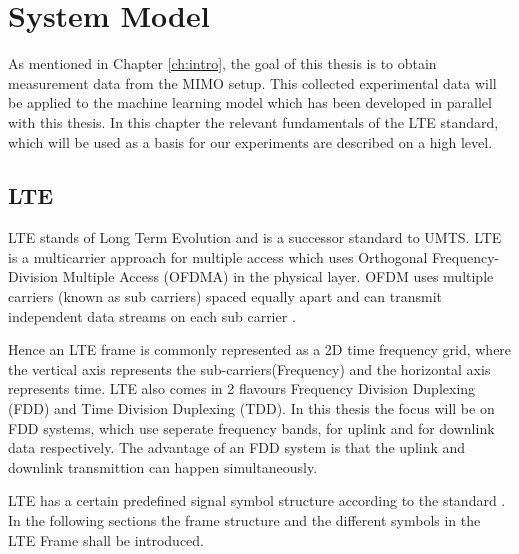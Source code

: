 \chapter{System Model}
\label{ch:sysmodel}

As mentioned in Chapter \ref{ch:intro}, the goal of this thesis is to obtain measurement data from the MIMO setup. This collected experimental data will be applied to the machine learning model which has been developed in parallel with this thesis. In this chapter the relevant fundamentals of the LTE standard, which will be used as a basis for our experiments are described on a high level.

%

\section{LTE}\label{sec:LTEProc}

LTE stands of Long Term Evolution and is a successor standard to UMTS. LTE is a multicarrier approach for multiple access which uses Orthogonal Frequency-Division Multiple Access (OFDMA) in the physical layer. OFDM uses multiple carriers (known as sub carriers) spaced equally apart and can transmit independent data streams on each sub carrier \cite{rohling}.

\par

Hence an LTE frame is commonly represented as a 2D time frequency grid, where the vertical axis represents the sub-carriers(Frequency) and the horizontal axis represents time. LTE also comes in 2 flavours Frequency Division Duplexing (FDD) and Time Division Duplexing (TDD). In this thesis the focus will be on FDD systems, which use seperate frequency bands, for uplink and for downlink data respectively. The advantage of an FDD system is that the uplink and downlink transmittion can happen simultaneously.

LTE has a certain predefined signal symbol structure according to the standard \cite{3gpp36211}. In the following sections the frame structure and the different symbols in the LTE Frame shall be introduced.

